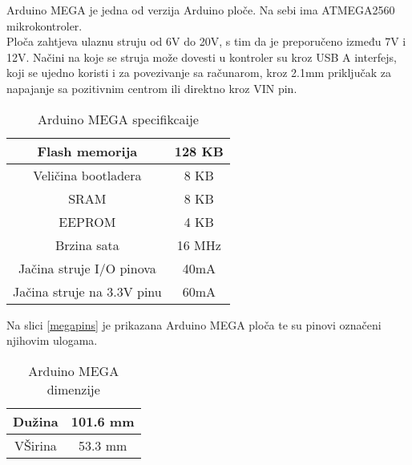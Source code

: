 \documentclass[../Document.tex]{subfiles}
\begin{document}
Arduino MEGA je jedna od verzija Arduino ploče. Na sebi ima ATMEGA2560 mikrokontroler.\\

Ploča zahtjeva ulaznu struju od 6V do 20V, s tim da je preporučeno između 7V i 12V. Načini na koje se struja može dovesti u kontroler su kroz USB A interfejs, koji se ujedno koristi i za povezivanje sa računarom, kroz 2.1mm priključak za napajanje sa pozitivnim centrom ili direktno kroz VIN pin.

\begin{table}[h]
  \centering
  \begin{tabular}{ |c|c| }
    \hline
    Flash memorija             & 128 KB \\
    \hline
    Veličina bootladera        & 8 KB   \\
    \hline
    SRAM                       & 8 KB   \\
    \hline
    EEPROM                     & 4 KB   \\
    \hline
    Brzina sata                & 16 MHz \\
    \hline
    Jačina struje I/O pinova   & 40mA   \\
    \hline
    Jačina struje na 3.3V pinu & 60mA   \\
    \hline
  \end{tabular}
  \caption{Arduino MEGA specifikcaije}
\end{table}

\noindent Na slici \ref{megapins} je prikazana Arduino MEGA ploča te su pinovi označeni njihovim ulogama.


\begin{table}[h!]
  \centering
  \begin{tabular}{ |c|c| }
    \hline
    Dužina  & 101.6 mm \\
    \hline
    VŠirina & 53.3 mm  \\
    \hline
  \end{tabular}
  \caption{Arduino MEGA dimenzije}
\end{table}
\end{document}
